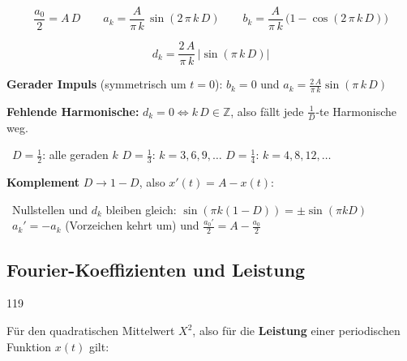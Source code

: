 \begin{center}
\end{center}\vspace{-1em}%

$$ \frac{a_0}{2} = A \, D \qquad a_k = \frac{A}{\pi \, k} \, \sin(2 \, \pi \, k \, D) \qquad b_k = \frac{A}{\pi \, k} \, \big( 1 - \cos(2 \, \pi \, k \, D) \big) $$

$$ \boxed{ d_k = \frac{2 \, A}{\pi \, k} \, \big| \sin(\pi \, k \, D) \big| } $$

\textbf{Gerader Impuls} (symmetrisch um $t = 0$): $b_k = 0$ und $a_k = \frac{2 \, A}{\pi \, k} \sin(\pi \, k \, D)$

\vspace{0.2cm}

\textbf{Fehlende Harmonische:} $d_k = 0 \iff k \, D \in \mathbb{Z}$, also fällt jede $\frac{1}{D}$-te Harmonische weg.

{\small
\textrightarrow\ $D = \frac{1}{2}$: alle geraden $k$ \qquad $D = \frac{1}{3}$: $k = 3, 6, 9, \ldots$ \qquad $D = \frac{1}{4}$: $k = 4, 8, 12, \ldots$
}

\vspace{0.2cm}

\textbf{Komplement} $D \to 1 - D$, also $x'(t) = A - x(t)$:

{\small
\textrightarrow\ Nullstellen und $d_k$ bleiben gleich: $\sin(\pi k (1-D)) = \pm \sin(\pi k D)$ \\
\textrightarrow\ $a_k' = - a_k$ (Vorzeichen kehrt um) und $\frac{a_0'}{2} = A - \frac{a_0}{2}$
}

\vspace{0.2cm}




\subsection{Fourier-Koeffizienten und Leistung}{119}

Für den quadratischen Mittelwert $X^2$, also für die \textbf{Leistung} einer periodischen Funktion $x(t)$ gilt:

